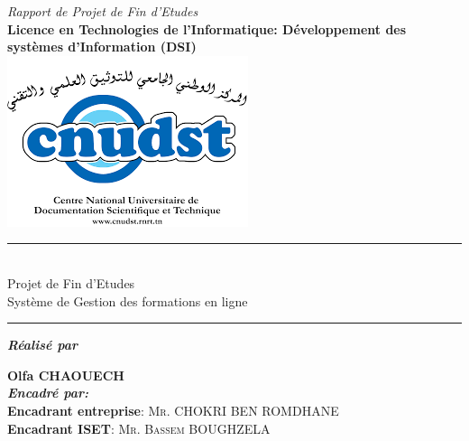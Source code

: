 \documentclass[a4paper, oneside, 12pt, final]{extreport}
\newcommand{\reportAuthor} {%
  Olfa \textsc{CHAOUECH}%
}
\newcommand{\reportSubject} {%
 Projet de Fin d'Etudes \\Système de Gestion des formations en ligne%
}
\newcommand{\dateSoutenance} {%
  12/06/2022%
}
\newcommand{\juryPresident} {%
  \textbf{Encadrant entreprise}: \textsc{Mr. CHOKRI BEN ROMDHANE}
}
\newcommand{\juryMemberOne} {%
  \textbf{Encadrant ISET}: \textsc{Mr. Bassem BOUGHZELA}
}
\begin{document}
\begin{titlepage}
\begin{center}
\vspace{5pt}


{\textit{Rapport de Projet de Fin d'Etudes}}\\

\vspace{5pt}
{\textbf{\large Licence en Technologies de l'Informatique:  Développement des systèmes d'Information (DSI)}}\\
\vspace{5pt}
\includegraphics[scale=0.4]{logo-essai.png}\\





 {%
	\fontsize{11pt}{11pt}\selectfont%
}%
 {%
  \renewcommand*{\familydefault}{\defaultFont}
  \fontsize{27pt}{27pt}\selectfont%
  \rule{1\textwidth}{.4pt}\\
  
  \reportSubject{}\\%
 
  \rule{1\textwidth}{.4pt}
}

\vspace{5pt}
\textbf{\textit{Réalisé par}}\\
\vspace{5pt}

{%
	\fontsize{11pt}{11pt}\selectfont%
	{\bfseries\Large\sc \reportAuthor}\\
}%
\vspace{5pt}
\textbf{\textit{Encadré par:}}\\
\vspace{5pt}
\juryPresident{}\\

\juryMemberOne{}



\end{center}
\end{titlepage}
\end{document}
